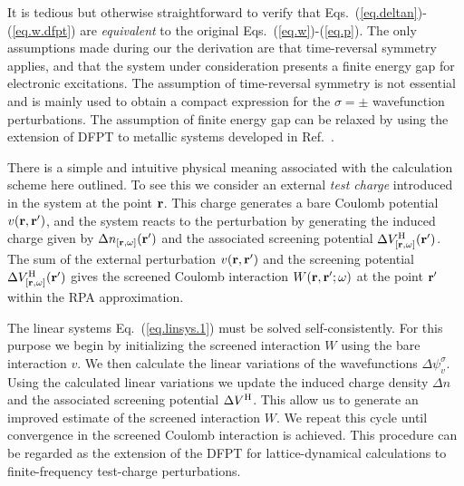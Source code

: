 \documentclass[twocolumn,prb,showpacs,superscriptaddress]{revtex4}
\def\w{\omega}
\def\s{\sigma}
\def\r{{\bf r}}
\def\rp{{\bf r^\prime}}
\begin{document}
It is tedious but otherwise straightforward to verify that 
Eqs.\ (\ref{eq.deltan})-(\ref{eq.w.dfpt}) are {\it equivalent} to the 
original Eqs.\ (\ref{eq.w})-(\ref{eq.p}).
The only assumptions made during our the derivation are that 
time-reversal symmetry applies,
and that the system under consideration presents a finite 
energy gap for electronic excitations. 
The assumption of time-reversal symmetry is not essential and is mainly used to
obtain a compact expression for the $\sigma=\pm$ wavefunction perturbations.
The assumption of finite energy gap can be relaxed by using the extension
of DFPT to metallic systems developed in Ref.\ . 


There is a simple and intuitive physical meaning associated with 
the calculation scheme here outlined. To see this
we consider an external {\it test charge} introduced in the system
at the point $\r$. This charge generates a bare Coulomb potential $v(\r,\rp)$,
and the system reacts to the perturbation by generating the induced charge
given by $\Delta n_{[\r,\w]}(\rp)$ and the associated 
screening potential $\Delta V^{\rm H}_{[\r,\w]}(\rp)$.
The sum of the external perturbation $v(\r,\rp)$ and the screening
potential $\Delta V^{\rm H}_{[\r,\w]}(\rp)$ gives the screened Coulomb
interaction $W(\r,\rp;\w)$ at the point $\rp$ within the RPA approximation.

The linear systems Eq.\ (\ref{eq.linsys.1}) must be solved self-consistently.
For this purpose we begin by initializing the screened
interaction $W$ using the bare interaction $v$. 
We then calculate the linear variations of the wavefunctions $\Delta \psi_v^\sigma$.
Using the calculated linear variations we update the induced charge density $\Delta n$
and the associated screening potential $\Delta V^{\rm H}$. This allow us to
generate an improved estimate of the screened interaction $W$.
We repeat this cycle until convergence in the screened Coulomb
interaction is achieved. This procedure can be regarded as the extension
of the DFPT for lattice-dynamical calculations to finite-frequency
test-charge perturbations. 
\end{document}
